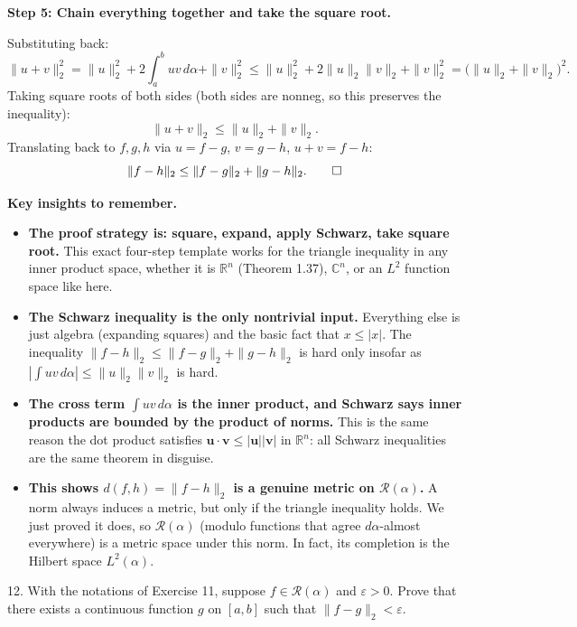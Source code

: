 \documentclass[10pt]{article}
\begin{document}
\medskip
\textbf{Step 5: Chain everything together and take the square root.}

Substituting back:
$$\|u+v\|_2^2 = \|u\|_2^2 + 2\int_a^b uv\,d\alpha + \|v\|_2^2 \leq \|u\|_2^2 + 2\|u\|_2\|v\|_2 + \|v\|_2^2 = \bigl(\|u\|_2 + \|v\|_2\bigr)^2.$$
Taking square roots of both sides (both sides are nonneg, so this preserves the inequality):
$$\|u + v\|_2 \leq \|u\|_2 + \|v\|_2.$$
Translating back to $f, g, h$ via $u = f-g$, $v = g-h$, $u+v = f-h$:
$$\|f - h\|_2 \leq \|f - g\|_2 + \|g - h\|_2. \qed$$

\medskip
\textbf{Key insights to remember.}

\begin{itemize}
  \item \textbf{The proof strategy is: square, expand, apply Schwarz, take square root.}
    This exact four-step template works for the triangle inequality in any inner product space, whether it is $\mathbb{R}^n$ (Theorem 1.37), $\mathbb{C}^n$, or an $L^2$ function space like here.

  \item \textbf{The Schwarz inequality is the only nontrivial input.}
    Everything else is just algebra (expanding squares) and the basic fact that $x \leq |x|$.
    The inequality $\|f-h\|_2 \leq \|f-g\|_2 + \|g-h\|_2$ is hard only insofar as $\left|\int uv\,d\alpha\right| \leq \|u\|_2\|v\|_2$ is hard.

  \item \textbf{The cross term $\int uv\,d\alpha$ is the inner product, and Schwarz says inner products are bounded by the product of norms.}
    This is the same reason the dot product satisfies $\mathbf{u} \cdot \mathbf{v} \leq |\mathbf{u}||\mathbf{v}|$ in $\mathbb{R}^n$: all Schwarz inequalities are the same theorem in disguise.

  \item \textbf{This shows $d(f, h) = \|f - h\|_2$ is a genuine metric on $\mathscr{R}(\alpha)$.}
    A norm always induces a metric, but only if the triangle inequality holds.
    We just proved it does, so $\mathscr{R}(\alpha)$ (modulo functions that agree $d\alpha$-almost everywhere) is a metric space under this norm.
    In fact, its completion is the Hilbert space $L^2(\alpha)$.
\end{itemize}
\color{black}

12. With the notations of Exercise 11, suppose $f \in \mathscr{R}(\alpha)$ and $\varepsilon>0$. Prove that there exists a continuous function $g$ on $[a, b]$ such that $\|f-g\|_{2}<\varepsilon$.
\end{document}

